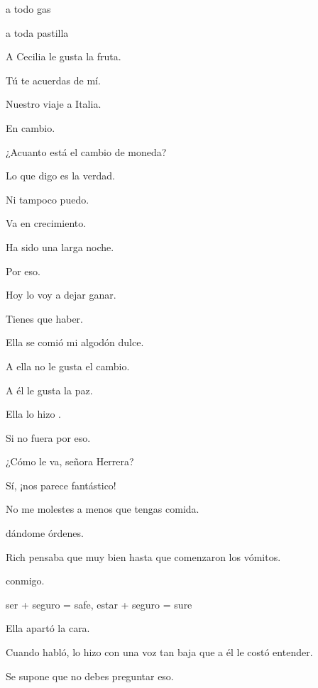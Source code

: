 a todo gas

a toda pastilla

\bsk
A Cecilia le gusta la fruta.

\sk
Tú te acuerdas de mí.

\sk
Nuestro viaje a Italia.

\sk
En cambio. 

\sk
¿Acuanto está el cambio de moneda?

\sk
Lo que digo es la verdad.

\sk
Ni tampoco puedo. 

\sk
Va en crecimiento. 

\sk
Ha sido una larga noche.

\sk
Por eso. 

\sk
Hoy lo voy a dejar ganar.

\sk
Tienes que haber. 

\sk
Ella se comió mi algodón dulce. 

\sk
A ella no le gusta el cambio.

\sk
A él le gusta la paz.

\sk
Ella lo hizo . 

\sk
Si no fuera por eso. 

\sk
¿Cómo le va, señora Herrera?

\sk
Sí, ¡nos parece fantástico! 

\sk
No me molestes a menos que tengas comida. 

\sk
{} dándome órdenes. 

\sk
Rich pensaba que  muy bien hasta que comenzaron los vómitos. 

\sk
{} conmigo. 

\sk
ser + seguro = safe, estar + seguro = sure

\sk
Ella apartó la cara. 

\sk
Cuando habló, lo hizo con una voz tan baja que a él le costó entender. 

\sk
Se supone que no debes preguntar eso. 

